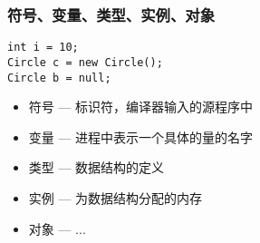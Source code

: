 \begin{frame}[fragile]
\frametitle{符号、变量、类型、实例、对象}

\begin{lstlisting}
int i = 10;
Circle c = new Circle();
Circle b = null;
\end{lstlisting}

\begin{itemize}
\setlength{\itemsep}{8pt plus 1pt}
\item 符号 --- 标识符，编译器输入的源程序中
\item 变量 --- 进程中表示一个具体的量的名字
\item 类型 --- 数据结构的定义
\item 实例 --- 为数据结构分配的内存
\item 对象 --- ...
\end{itemize}

\end{frame}


